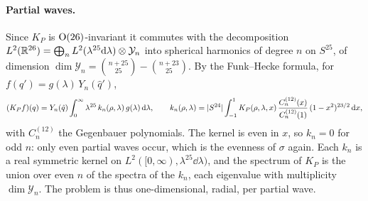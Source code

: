 \paragraph{Partial waves.}
Since $K_P$ is $\mathrm{O}(26)$-invariant it commutes with the decomposition $L^2(\mathbb{R}^{26}) = \bigoplus_n L^2(\lambda^{25} \mathrm{d} \lambda) \otimes \mathcal Y_n$ into spherical harmonics of degree $n$ on $S^{25}$, of dimension $\dim \mathcal Y_n = \binom{n + 25}{25} - \binom{n + 23}{25}$.
By the Funk--Hecke formula, for $f(q') = g(\lambda) \, Y_n(\hat q')$,
\begin{equation}
  \label{eq:mom:funk-hecke}
  (K_P f)(q)
    = Y_n(\hat q) \int_0^\infty \lambda^{25} \, k_n(\rho, \lambda) \, g(\lambda) \, \mathrm{d} \lambda,
  \qquad
  k_n(\rho, \lambda)
    = {|S^{24}|} \int_{-1}^1 K_P(\rho, \lambda, x) \, \frac{C^{(12)}_n(x)}{C^{(12)}_n(1)} \, (1 - x^2)^{23/2} \, \mathrm{d} x,
\end{equation}
with $C^{(12)}_n$ the Gegenbauer polynomials.
The kernel is even in $x$, so $k_n = 0$ for odd $n$: only even partial waves occur, which is the evenness of $\sigma$ again.
Each $k_n$ is a real symmetric kernel on $L^2([0, \infty), \lambda^{25} \dd \lambda)$, and the spectrum of $K_P$ is the union over even $n$ of the spectra of the $k_n$, each eigenvalue with multiplicity $\dim \mathcal Y_n$.
The problem is thus one-dimensional, radial, per partial wave.

